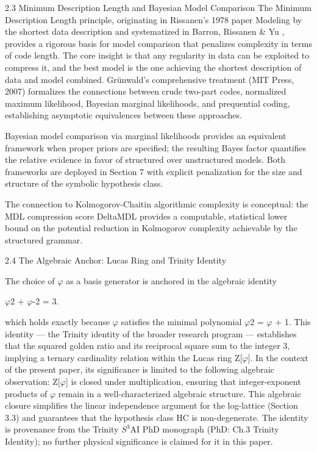   2.3 Minimum Description Length and Bayesian Model Comparison
  The Minimum Description Length principle, originating in Rissanen's 1978 paper \citep{rissanen1978}
  Modeling by the shortest data description \citep{rissanen1978} and systematized in
  Barron, Rissanen \& Yu \citep{barron1998}, provides a rigorous basis for model comparison that
  penalizes complexity in terms of code length. The core insight is that any regularity in
  data can be exploited to compress it, and the best model is the one achieving the
  shortest description of data and model combined. Grünwald's comprehensive treatment \citep{grunwald2007}
  (MIT Press, 2007) formalizes the connections between crude two-part codes,
  normalized maximum likelihood, Bayesian marginal likelihoods, and prequential coding,
  establishing asymptotic equivalences between these approaches.

  Bayesian model comparison via marginal likelihoods provides an equivalent framework
  when proper priors are specified; the resulting Bayes factor quantifies the relative
  evidence in favor of structured over unstructured models. Both frameworks are
  deployed in Section 7 with explicit penalization for the size and structure of the
  symbolic hypothesis class.

  The connection to Kolmogorov-Chaitin algorithmic complexity \citep{chaitin1987} is conceptual: the MDL compression score DeltaMDL provides a
  computable, statistical lower bound on the potential reduction in Kolmogorov
  complexity achievable by the structured grammar.

  2.4 The Algebraic Anchor: Lucas Ring and Trinity Identity

  The choice of $\varphi$ as a basis generator is anchored in the algebraic identity

  $\varphi$2 + $\varphi$-2 = 3.

  which holds exactly because $\varphi$ satisfies the minimal polynomial $\varphi$2 = $\varphi$ + 1. This
  identity --- the Trinity identity of the broader research program --- establishes that the
  squared golden ratio and its reciprocal square sum to the integer 3, implying a ternary
  cardinality relation within the Lucas ring Z[$\varphi$]. In the context of the present paper, its
  significance is limited to the following algebraic observation: Z[$\varphi$] is closed under
  multiplication, ensuring that integer-exponent products of $\varphi$ remain in a
  well-characterized algebraic structure. This algebraic closure simplifies the linear
  independence argument for the log-lattice (Section 3.3) and guarantees that the
  hypothesis class HC is non-degenerate. The identity is provenance from the Trinity $S^{3}$AI
  PhD monograph (PhD: Ch.3 Trinity Identity); no further physical significance is claimed
  for it in this paper.

